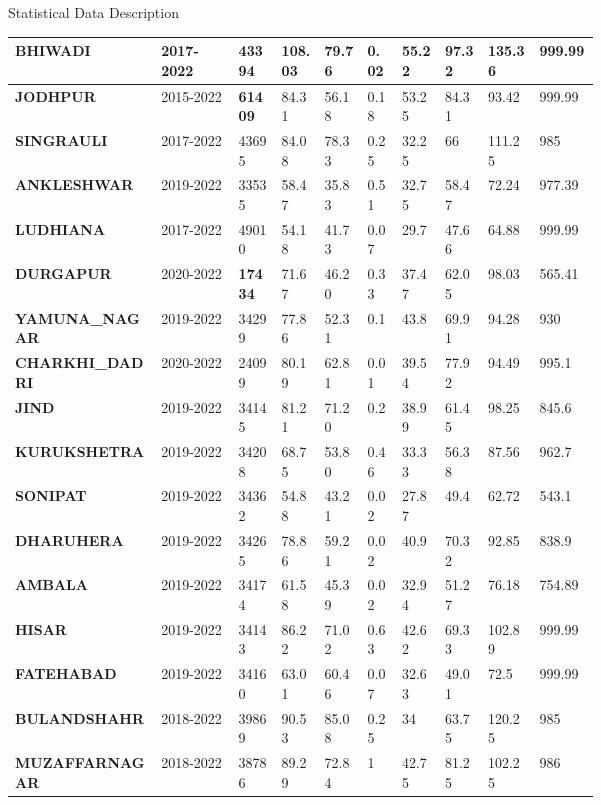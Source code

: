 \documentclass[12pt, aspectratio=169]{beamer}
\begin{document}
\begin{frame}{Statistical Data Description}
\begin{table}
\begin{tabular}{|p{0.17\linewidth}|p{0.09\linewidth}|p{0.05\linewidth}|p{0.05\linewidth}|p{0.05\linewidth}|p{0.04\linewidth}|p{0.05\linewidth}|p{0.05\linewidth}|p{0.06\linewidth}|p{0.07\linewidth}|}
		\textbf{BHIWADI}          & 2017-2022  & 43394   & 108.03 & 79.76  & 0.02 & 55.22   & 97.32       & 135.36 & 999.99 \\ \hline
		\textbf{JODHPUR}     & 2015-2022 &\textbf{61409} & 84.31 & 56.18 & 0.18 & 53.25   & 84.31 & 93.42   & 999.99 \\ \hline
		\textbf{SINGRAULI}    & 2017-2022 & 43695   & 84.08 & 78.33 & 0.25 & 32.25   & 66          & 111.25  & 985    \\ \hline
		\textbf{ANKLESHWAR}   & 2019-2022  & 33535     & 58.47 & 35.83 & 0.51 & 32.75   & 58.47 & 72.24   & 977.39 \\ \hline 
		\textbf{LUDHIANA}        & 2017-2022  & 49010  & 54.18 & 41.73 & 0.07 & 29.7    & 47.66       & 64.88   & 999.99 \\ \hline
		\textbf{DURGAPUR}       & 2020-2022 & \textbf{17434}   & 71.67 & 46.20 & 0.33 & 37.47 & 62.05      & 98.03 & 565.41 \\ \hline 
		\textbf{YAMUNA\_NAGAR}  & 2019-2022 & 34299   & 77.86  & 52.31 & 0.1  & 43.8    & 69.91       & 94.28   & 930    \\ \hline
		\textbf{CHARKHI\_DADRI}  & 2020-2022  & 24099   & 80.19 & 62.81 & 0.01 & 39.54  & 77.92       & 94.49  & 995.1  \\ \hline 
		\textbf{JIND  }           & 2019-2022 & 34145 & 81.21 & 71.20 & 0.2  & 38.99   & 61.45       & 98.25   & 845.6  \\ \hline 
		\textbf{KURUKSHETRA}    & 2019-2022  & 34208 & 68.75& 53.80 & 0.46 & 33.33   & 56.38       & 87.56   & 962.7  \\ \hline 
		\textbf{SONIPAT}        & 2019-2022  & 34362  & 54.88 & 43.21  & 0.02 & 27.87   & 49.4        & 62.72   & 543.1  \\ \hline 
		\textbf{DHARUHERA}     & 2019-2022 & 34265 & 78.86 & 59.21 & 0.02 & 40.9    & 70.32       & 92.85   & 838.9  \\ \hline
		\textbf{AMBALA}         & 2019-2022 & 34174 & 61.58 & 45.39 & 0.02 & 32.94   & 51.27       & 76.18 & 754.89 \\ \hline
		\textbf{HISAR}          & 2019-2022 & 34143 & 86.22 & 71.02 & 0.63 & 42.62   & 69.33       & 102.89 & 999.99 \\ \hline 
		\textbf{FATEHABAD}      & 2019-2022 & 34160 & 63.01 & 60.46 & 0.07 & 32.63   & 49.01       & 72.5    & 999.99 \\ \hline
		\textbf{BULANDSHAHR}  & 2018-2022 & 39869  & 90.53 & 85.08 & 0.25 & 34      & 63.75       & 120.25  & 985    \\ \hline 
		\textbf{MUZAFFARNAGAR}  & 2018-2022 & 38786 & 89.29 & 72.84  & 1    & 42.75   & 81.25       & 102.25  & 986    \\ \hline
		\end{tabular}
	\end{table}
\end{frame}
\end{document}
